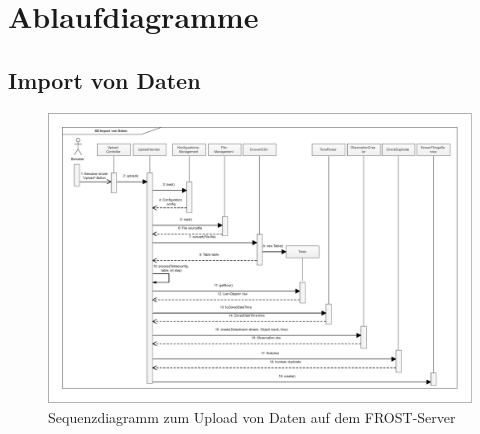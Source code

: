 \section{Ablaufdiagramme}

\subsection{Import von Daten}

\begin{figure}[htbp]
\centering
\includegraphics[scale=0.44]{uml/SD_upload.eps}
\caption{Sequenzdiagramm zum Upload von Daten auf dem FROST-Server}
\end{figure}